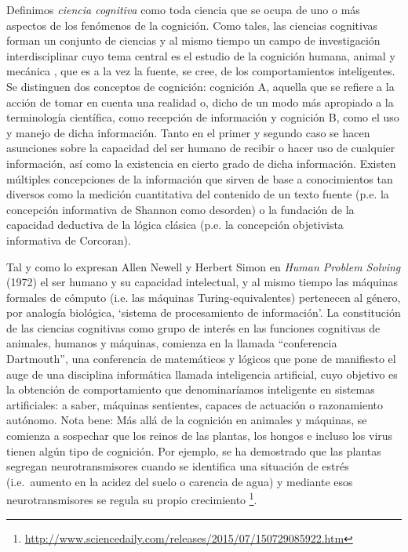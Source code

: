 \documentclass[12pt]{memoir}
\begin{document}
Definimos \textit{ciencia cognitiva} como toda ciencia que se ocupa de uno o más aspectos de los fenómenos de la cognición. Como tales, las ciencias cognitivas forman un conjunto de ciencias y al mismo tiempo un campo de investigación interdisciplinar cuyo tema central es el estudio de la cognición humana, animal y mecánica \parencite[p.20]{pmf07}, que es a la vez la fuente, se cree, de los comportamientos inteligentes. Se distinguen dos conceptos de cognición: cognición A, aquella que se refiere a la acción de tomar en cuenta una realidad o, dicho de un modo más apropiado a la terminología científica, como recepción de información y cognición B, como el uso y manejo de dicha información. Tanto en el primer y segundo caso se hacen asunciones sobre la capacidad del ser humano de recibir o hacer uso de cualquier información, así como la existencia en cierto grado de dicha información. Existen múltiples concepciones de la información que sirven de base a conocimientos tan diversos como la medición cuantitativa del contenido de un texto fuente (p.e. la concepción informativa de Shannon como desorden) o la fundación de la capacidad deductiva de la
lógica clásica (p.e. la concepción objetivista informativa de Corcoran).

Tal y como lo expresan Allen Newell y Herbert Simon en \textit{Human Problem Solving}
(1972) el ser humano y su capacidad intelectual, y al mismo tiempo las máquinas formales de cómputo (i.e. las máquinas Turing-equivalentes) pertenecen al género, por analogía biológica, `sistema de procesamiento de información'. La constitución de las ciencias cognitivas como grupo de interés en las funciones cognitivas de animales, humanos y máquinas, comienza en la llamada ``conferencia Dartmouth'', una conferencia de matemáticos y lógicos que pone de manifiesto el auge de una disciplina informática llamada inteligencia artificial, cuyo objetivo es la obtención de comportamiento que denominaríamos inteligente en sistemas artificiales: a saber, máquinas sentientes, capaces de actuación o razonamiento autónomo. Nota bene: Más allá de la cognición en animales y máquinas, se comienza a sospechar que los reinos de las plantas, los hongos e incluso los virus tienen algún tipo de cognición. Por ejemplo, se ha demostrado que las plantas segregan neurotransmisores cuando se identifica una situación de estrés (i.e.\ aumento en la acidez del suelo o carencia de agua) y mediante esos neurotransmisores se regula su propio crecimiento \footnote{\url{http://www.sciencedaily.com/releases/2015/07/150729085922.htm} }.
\end{document}
